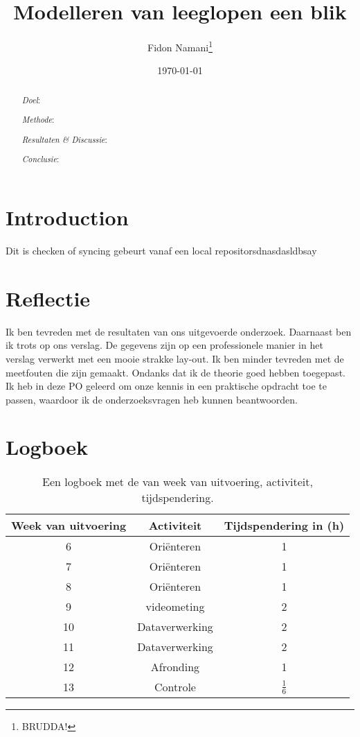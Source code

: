 \documentclass[numbers=endperiod]{scrartcl}
\title{Modelleren van leeglopen een blik}
\author{Fidon Namani\thanks{BRUDDA!}}
\date{\today}
\begin{document}
\maketitle
\begin{abstract}
    \textit{Doel}:

    \textit{Methode}:

    \textit{Resultaten \& Discussie}:

    \textit{Conclusie}:
\end{abstract}
\section{Introduction}
Dit is checken of syncing gebeurt vanaf een local repositorsdnasdasldbsay







\newpage
\section{Reflectie}
Ik ben tevreden met de resultaten van ons uitgevoerde onderzoek. Daarnaast
ben ik trots op ons verslag. De gegevens zijn op een professionele
manier in het verslag verwerkt met een mooie strakke lay-out. Ik ben minder
tevreden met de meetfouten die zijn gemaakt. Ondanks dat ik de theorie
goed hebben toegepast. Ik heb in deze PO geleerd om onze kennis in
een praktische opdracht toe te passen, waardoor ik de onderzoeksvragen
heb kunnen beantwoorden.

\newpage
\appendix
\section{Logboek}
\begin{table}[ht]
\centering
\caption{Een logboek met de van week van uitvoering, activiteit, tijdspendering.}
\begin{tabular}{Scc}
\toprule
{Week van uitvoering} & Activiteit & Tijdspendering in (\si{\hour})\\
 & Oriënteren & 1\\
7 & Oriënteren & 1\\
8 & Oriënteren & 1\\
9 & videometing & 2\\
10 & Dataverwerking & 2\\
11 & Dataverwerking & 2\\
12 & Afronding & 1\\
13 & Controle & $\frac{1}{6}$\\
\bottomrule
\end{tabular}
\end{table}
\end{document}
